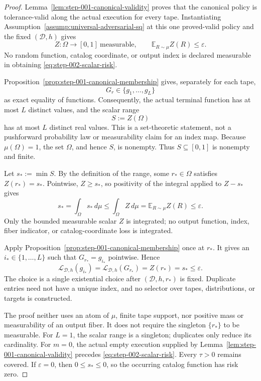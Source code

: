 \begin{proof}
Lemma~\ref{lem:step-001-canonical-validity} proves that the canonical policy
is tolerance-valid along the actual execution for every tape.  Instantiating
Assumption~\ref{assump:universal-adversarial-sq} at this one proved-valid
policy and the fixed \((\mathcal D,h)\) gives
\begin{equation}
Z:\Omega\to[0,1]\ \text{measurable},
\qquad
\mathbb E_{R\sim\mu}Z(R)\le\varepsilon.
\label{eq:step-002-scalar-risk}
\end{equation}
No random function, catalog coordinate, or output index is declared
measurable in obtaining \eqref{eq:step-002-scalar-risk}.

Proposition~\ref{prop:step-001-canonical-membership} gives, separately for
each tape,
\[
G_r\in\{g_1,\ldots,g_L\}
\]
as exact equality of functions.  Consequently, the actual terminal function
has at most \(L\) distinct values, and the scalar range
\[
S:=Z(\Omega)
\]
has at most \(L\) distinct real values.  This is a set-theoretic statement,
not a pushforward probability law or measurability claim for an index map.
Because \(\mu(\Omega)=1\), the set \(\Omega\), and hence \(S\), is nonempty.
Thus \(S\subseteq[0,1]\) is nonempty and finite.

Let \(s_*:=\min S\).  By the definition of the range, some
\(r_*\in\Omega\) satisfies \(Z(r_*)=s_*\).  Pointwise, \(Z\ge s_*\), so
positivity of the integral applied to \(Z-s_*\) gives
\begin{equation}
s_*=\int_{\Omega}s_*\,d\mu
\le\int_{\Omega}Z\,d\mu
=\mathbb E_{R\sim\mu}Z(R)
\le\varepsilon.
\label{eq:step-002-minimum-expectation}
\end{equation}
Only the bounded measurable scalar \(Z\) is integrated; no output function,
index, fiber indicator, or catalog-coordinate loss is integrated.

Apply Proposition~\ref{prop:step-001-canonical-membership} once at \(r_*\).
It gives an \(i_*\in\{1,\ldots,L\}\) such that \(G_{r_*}=g_{i_*}\)
pointwise.  Hence
\begin{equation}
\mathcal L_{\mathcal D,h}(g_{i_*})
=\mathcal L_{\mathcal D,h}(G_{r_*})
=Z(r_*)=s_*\le\varepsilon.
\label{eq:step-002-attained-risk}
\end{equation}
The choice is a single existential choice after
\((\mathcal D,h,r_*)\) is fixed.  Duplicate entries need not have a unique
index, and no selector over tapes, distributions, or targets is constructed.

The proof neither uses an atom of \(\mu\), finite tape support, nor positive
mass or measurability of an output fiber.  It does not require the singleton
\(\{r_*\}\) to be measurable.  For \(L=1\), the scalar range is a
singleton; duplicates only reduce its cardinality.  For \(m=0\), the actual
empty execution supplied by Lemma~\ref{lem:step-001-canonical-validity}
precedes \eqref{eq:step-002-scalar-risk}.  Every \(\tau>0\) remains covered.
If \(\varepsilon=0\), then \(0\le s_*\le0\), so the occurring catalog
function has risk zero.
\end{proof}

